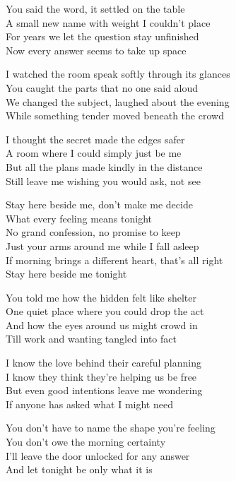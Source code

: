\begin{lyrics}
You said the word, it settled on the table\\
A small new name with weight I couldn't place\\
For years we let the question stay unfinished\\
Now every answer seems to take up space

I watched the room speak softly through its glances\\
You caught the parts that no one said aloud\\
We changed the subject, laughed about the evening\\
While something tender moved beneath the crowd

I thought the secret made the edges safer\\
A room where I could simply just be me\\
But all the plans made kindly in the distance\\
Still leave me wishing you would ask, not see

Stay here beside me, don't make me decide\\
What every feeling means tonight\\
No grand confession, no promise to keep\\
Just your arms around me while I fall asleep\\
If morning brings a different heart, that's all right\\
Stay here beside me tonight

You told me how the hidden felt like shelter\\
One quiet place where you could drop the act\\
And how the eyes around us might crowd in\\
Till work and wanting tangled into fact

I know the love behind their careful planning\\
I know they think they're helping us be free\\
But even good intentions leave me wondering\\
If anyone has asked what I might need

You don't have to name the shape you're feeling\\
You don't owe the morning certainty\\
I'll leave the door unlocked for any answer\\
And let tonight be only what it is


\end{lyrics}
